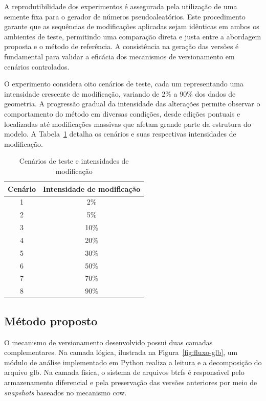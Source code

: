 A reprodutibilidade dos experimentos é assegurada pela utilização de uma semente
fixa para o gerador de números pseudoaleatórios. Este procedimento garante que as
sequências de modificações aplicadas sejam idênticas em ambos os ambientes de teste,
permitindo uma comparação direta e justa entre a abordagem proposta e o método de
referência. A consistência na geração das versões é fundamental para validar a
eficácia dos mecanismos de versionamento em cenários controlados.

O experimento considera oito cenários de teste, cada um representando uma
intensidade crescente de modificação, variando de 2\% a 90\% dos dados de geometria.
A progressão gradual da intensidade das alterações permite observar o comportamento
do método em diversas condições, desde edições pontuais e localizadas até
modificações massivas que afetam grande parte da estrutura do modelo. A
Tabela~\ref{tab:cenarios} detalha os cenários e suas respectivas intensidades de
modificação.

\begin{table}[htb]
  \centering
  \caption{\label{tab:cenarios}Cenários de teste e intensidades de modificação}
  \begin{tabular}{cc}
    \toprule
    \textbf{Cenário} & \textbf{Intensidade de modificação} \\
    \midrule
    1 & 2\%  \\
    2 & 5\%  \\
    3 & 10\% \\
    4 & 20\% \\
    5 & 30\% \\
    6 & 50\% \\
    7 & 70\% \\
    8 & 90\% \\
    \bottomrule
  \end{tabular}
\end{table}

\subsection{Método proposto}

O mecanismo de versionamento desenvolvido possui duas camadas complementares. Na
camada lógica, ilustrada na Figura~\ref{fig:fluxo-glb}, um módulo de análise
implementado em Python realiza a leitura e a decomposição do arquivo \gls{glb}. Na
camada física, o sistema de arquivos \gls{btrfs} é responsável pelo armazenamento
diferencial e pela preservação das versões anteriores por meio de
\textit{snapshots} baseados no mecanismo \gls{cow}.


